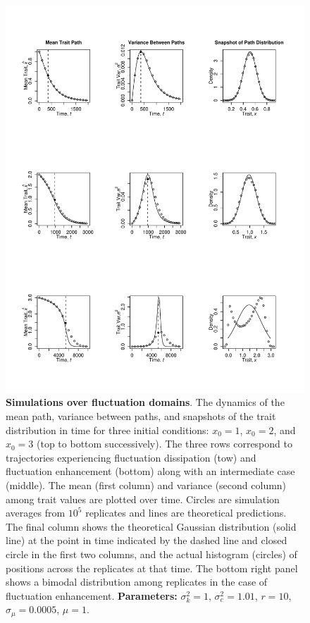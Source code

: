 \begin{figure}
\begin{center}
\includegraphics[width=.9\textwidth]{../fluctuationRegimes/figure2}
\caption{\textbf{Simulations over fluctuation domains}.  The dynamics of the mean path, variance between paths, and snapshots of the trait distribution in time for three initial conditions: $x_0=1$, $x_0=2$, and $x_0=3$ (top to bottom successively).  The three rows correspond to trajectories experiencing fluctuation dissipation (tow) and fluctuation enhancement (bottom) along with an intermediate case (middle). The mean (first column) and variance (second column) among trait values are plotted over time.  Circles are simulation averages from $10^5$ replicates and lines are theoretical predictions.  The final column shows the theoretical Gaussian distribution (solid line) at the point in time indicated by the dashed line
and closed circle in the first two columns, and the 
actual histogram (circles) of positions across the replicates at that time.  
The bottom right panel shows a bimodal distribution among replicates in the case
of fluctuation enhancement.  
\textbf{Parameters:} $\sigma_k^2 = 1$, $\sigma_c^2 = 1.01$, $r=10$, $\sigma_{\mu} = 0.0005$, $\mu = 1$.}\label{2}
\end{center}
\end{figure}
 
